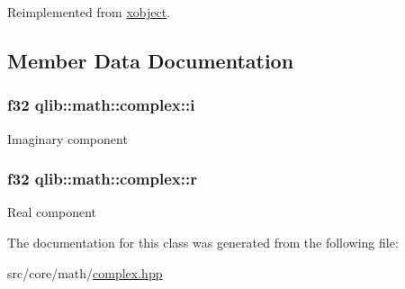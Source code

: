 Reimplemented from \hyperlink{classxobject_ad76243a44c4e4959d3b16bb57d82600d}{xobject}.



\subsection{Member Data Documentation}
\subsubsection[{\texorpdfstring{i}{i}}]{\setlength{\rightskip}{0pt plus 5cm}f32 qlib\+::math\+::complex\+::i}\hypertarget{classqlib_1_1math_1_1complex_a4d599b5885fd37c300cdb79433356bb5}{}\label{classqlib_1_1math_1_1complex_a4d599b5885fd37c300cdb79433356bb5}
Imaginary component 
\subsubsection[{\texorpdfstring{r}{r}}]{\setlength{\rightskip}{0pt plus 5cm}f32 qlib\+::math\+::complex\+::r}\hypertarget{classqlib_1_1math_1_1complex_aceb455ba091019bbd625fdaf529a0107}{}\label{classqlib_1_1math_1_1complex_aceb455ba091019bbd625fdaf529a0107}
Real component 

The documentation for this class was generated from the following file\+:\begin{DoxyCompactItemize}
\item 
src/core/math/\hyperlink{complex_8hpp}{complex.\+hpp}\end{DoxyCompactItemize}
